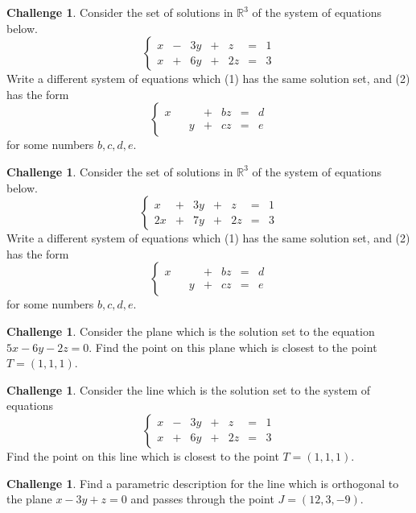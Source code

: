 \documentclass{tufte-book}
\theoremstyle{definition}
\newtheorem{challenge}[task]{Challenge}
\begin{document}
\begin{challenge}
Consider the set of solutions in $\mathbb{R}^3$ of the system of equations below. 
\[
\left\{\begin{array}{rrrrrrr}
x & - & 3y & + & z & = & 1 \\
x & + & 6y & + & 2z & = & 3
\end{array}\right.
\]
Write a different system of equations which (1) has the same solution set, and (2) has the form
\[
\left\{\begin{array}{rrrrrrr}
x &  &  & + & bz & = & d \\
 &  & y & + & cz & = & e
\end{array}\right.
\]
for some numbers $b,c,d,e$.
\end{challenge}

\begin{challenge}
Consider the set of solutions in $\mathbb{R}^3$ of the system of equations below. 
\[
\left\{\begin{array}{rrrrrrr}
x & + & 3y & + & z & = & 1 \\
2x & + & 7y & + & 2z & = & 3
\end{array}\right.
\]
Write a different system of equations which (1) has the same solution set, and (2) has the form
\[
\left\{\begin{array}{rrrrrrr}
x &  &  & + & bz & = & d \\
 &  & y & + & cz & = & e
\end{array}\right.
\]
for some numbers $b,c,d,e$.
\end{challenge}

\begin{challenge}
Consider the plane which is the solution set to the equation $5x-6y-2z=0$. Find the point on this plane which is closest to the point $T = (1,1,1)$.
\end{challenge}

\begin{challenge}
Consider the line which is the solution set to the system of equations
\[
\left\{\begin{array}{rrrrrrr}
x & - & 3y & + & z & = & 1 \\
x & + & 6y & + & 2z & = & 3
\end{array}\right.
\]
Find the point on this line which is closest to the point $T = (1,1,1)$.
\end{challenge}

\begin{challenge}
Find a parametric description for the line which is orthogonal to the plane $x-3y+z=0$ and passes through the point $J = (12,3,-9)$.
\end{challenge}
\end{document}
